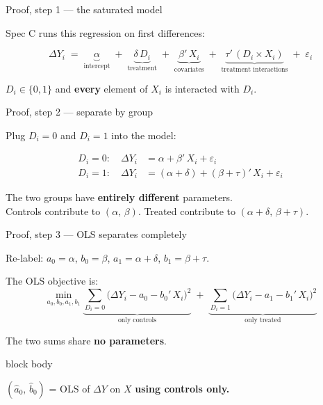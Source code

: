 \documentclass[aspectratio=169,11pt]{beamer}
\newcommand{\emphbox}[1]{%
  \begin{beamercolorbox}[rounded=true,sep=7pt,wd=\linewidth]{block body}%
    \small\color{slate}\raggedright #1%
  \end{beamercolorbox}}
\begin{document}
\begin{frame}{Proof, step 1 --- the saturated model}
\vspace{0.4em}
\begin{center}\color{warmgray}\small
Spec C runs this regression on first differences:\end{center}
\vspace{0.3em}
\[
\Delta Y_i \;=\; \underbrace{\alpha}_{\text{intercept}}
            \;+\; \underbrace{\delta\, D_i}_{\text{treatment}}
            \;+\; \underbrace{\beta'\, X_i}_{\text{covariates}}
            \;+\; \underbrace{\tau'\,(D_i \times X_i)}_{\text{treatment interactions}}
            \;+\; \varepsilon_i
\]
\vspace{0.4em}
\begin{center}
$D_i \in \{0, 1\}$ \quad and \quad \textbf{every} element of $X_i$ is interacted with $D_i$.
\end{center}
\end{frame}

\begin{frame}{Proof, step 2 --- separate by group}
\vspace{0.3em}
\begin{center}\color{warmgray}\small Plug $D_i = 0$ and $D_i = 1$ into the model:\end{center}
\vspace{0.4em}
\begin{align*}
D_i = 0: \quad \Delta Y_i &= \alpha + \beta'\, X_i + \varepsilon_i \\[6pt]
D_i = 1: \quad \Delta Y_i &= (\alpha + \delta) + (\beta + \tau)'\, X_i + \varepsilon_i
\end{align*}
\vspace{0.4em}
\begin{center}
The two groups have \textbf{entirely different} parameters.\\[0.4em]
\color{warmgray}\small
Controls contribute to $(\alpha,\,\beta)$.\quad
Treated contribute to $(\alpha+\delta,\,\beta+\tau)$.
\end{center}
\end{frame}

\begin{frame}{Proof, step 3 --- OLS separates completely}
\vspace{0.4em}
\begin{center}\color{warmgray}\small
Re-label: \;$a_0 = \alpha$, \;$b_0 = \beta$, \;$a_1 = \alpha+\delta$, \;$b_1 = \beta+\tau$.
\end{center}
\vspace{0.3em}
The OLS objective is:
\[
\min_{a_0,b_0,a_1,b_1}
  \underbrace{\sum_{D_i=0}\!\bigl(\Delta Y_i - a_0 - b_0'\,X_i\bigr)^{\!2}}_{\text{only controls}}
  \;+\;
  \underbrace{\sum_{D_i=1}\!\bigl(\Delta Y_i - a_1 - b_1'\,X_i\bigr)^{\!2}}_{\text{only treated}}
\]
\vspace{0.3em}
\begin{center}
The two sums share \textbf{no parameters}.\\[0.4em]
\emphbox{$(\hat a_0,\,\hat b_0)$ \;=\; OLS of $\Delta Y$ on $X$ \textbf{using controls only.}}
\end{center}
\end{frame}
\end{document}
